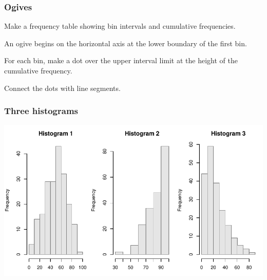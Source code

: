 \documentclass[12pt]{beamer}\usepackage[]{graphicx}\usepackage[]{color}
\newenvironment{knitrout}{}{} %
\begin{document}

\begin{frame}
\frametitle{Ogives}

\bbi
  \item Make a frequency table showing bin intervals and cumulative frequencies.
  \item An ogive begins on the horizontal axis at the lower boundary of the first bin.
  \item For each bin, make a dot over the upper interval limit at the height of the cumulative frequency.
  \item Connect the dots with line segments.
\ei
\eb

\end{frame}


\begin{frame}
\begin{center}
\Huge{}
\end{center}
\end{frame}


\begin{frame}[fragile]
\frametitle{Three histograms}
\begin{knitrout}\footnotesize
{}\color{fgcolor}

{\centering \includegraphics[width=.9\linewidth,height=.5\linewidth]{figure/unnamed-chunk-28-1} 

}



\end{knitrout}

\end{frame}
\end{document}
